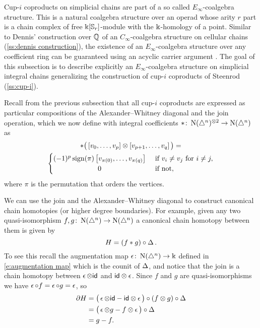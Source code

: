 Cup-$i$ coproducts on simplicial chains are part of a so called $E_\infty$-coalgebra structure.
This is a natural coalgebra structure over an operad whose arity $r$ part is a chain complex of free $\Bbbk[\mathbb{S}_r]$-module with the $\Bbbk$-homology of a point.
Similar to Dennis' construction over $\mathbb{Q}$ of an $C_\infty$-coalgebra structure on cellular chains (\cref{ss:dennis construction}), the existence of an $E_\infty$-coalgebra structure over any coefficient ring can be guaranteed using an acyclic carrier argument \cite{eilenberg1953acyclic}.
The goal of this subsection is to describe explicitly an $E_\infty$-coalgebra structure on simplicial integral chains generalizing the construction of cup-$i$ coproducts of Steenrod (\cref{ss:cup-i}).

Recall from the previous subsection that all cup-$i$ coproducts are expressed as particular compositions of the Alexander--Whitney diagonal and the join operation, which we now define with integral coefficients $\ast \colon \operatorname{N}(\triangle^n)^{\otimes 2} \to \operatorname{N}(\triangle^n)$ as
\begin{multline}
\ast \big(\left[v_0, \dots, v_p \right] \ot \left[v_{p+1}, \dots, v_q\right]\big) = \\
\begin{cases} (-1)^{p} \sign(\pi) \left[v_{\pi(0)}, \dots, v_{\pi(q)}\right] & \text{ if } v_i \neq v_j \text{ for } i \neq j, \\
\hfil 0 & \text{ if not}, \end{cases}
\end{multline}
where $\pi$ is the permutation that orders the vertices.

We can use the join and the Alexander--Whitney diagonal to construct canonical chain homotopies (or higher degree boundaries).
For example, given any two quasi-isomorphism $f, g \colon \operatorname{N}(\triangle^n) \to \operatorname{N}(\triangle^n)$ a canonical chain homotopy between them is given by
\[
H = (f \ast g) \circ \operatorname{\Delta}.
\]
To see this recall the augmentation map $\operatorname{\epsilon} \colon \operatorname{N}(\triangle^n) \to \Bbbk$ defined in \eqref{e:augmentation map} which is the counit of $\operatorname{\Delta}$, and notice that the join is a chain homotopy between $\operatorname{\epsilon} \otimes \mathsf{id}$ and $\mathsf{id} \otimes \operatorname{\epsilon}$.
Since $f$ and $g$ are quasi-isomorphisms we have $\operatorname{\epsilon} \circ f = \operatorname{\epsilon} \circ g = \operatorname{\epsilon}$, so
\begin{align*}
\partial H &=
\big( \operatorname{\epsilon} \otimes \mathsf{id} - \mathsf{id} \otimes \operatorname{\epsilon} \big) \circ (f \otimes g) \circ \operatorname{\Delta} \\ &=
\big(\operatorname{\epsilon} \otimes g - f \otimes \operatorname{\epsilon} \big) \circ \operatorname{\Delta} \\ &= g - f.
\end{align*}

